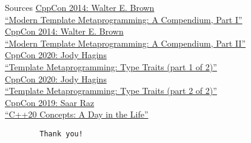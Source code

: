 \documentclass{beamer}
\begin{document}
\begin{frame}[fragile]{Sources}
\href{https://www.youtube.com/watch?v=Am2is2QCvxY&ab_channel=CppCon}{CppCon 2014: Walter E. Brown\\``Modern Template Metaprogramming: A Compendium, Part I''}\\
\vspace{1em}
\href{https://www.youtube.com/watch?v=a0FliKwcwXE&ab_channel=CppCon}{CppCon 2014: Walter E. Brown\\``Modern Template Metaprogramming: A Compendium, Part II''}\\
\vspace{1em}
\href{https://www.youtube.com/watch?v=tiAVWcjIF6o&ab_channel=CppCon}{CppCon 2020: Jody Hagins\\``Template Metaprogramming: Type Traits (part 1 of 2)''}\\
\vspace{1em}
\href{https://www.youtube.com/watch?v=dLZcocFOb5Q&ab_channel=CppCon}{CppCon 2020: Jody Hagins\\``Template Metaprogramming: Type Traits (part 2 of 2)''}\\
\vspace{1em}
\href{https://www.youtube.com/watch?v=qawSiMIXtE4&ab_channel=CppCon}{CppCon 2019: Saar Raz\\``C++20 Concepts: A Day in the Life''}
\vspace{2em}
\pause
{}
\begin{lstlisting}
		Thank you!
\end{lstlisting}
\end{frame}
\end{document}
